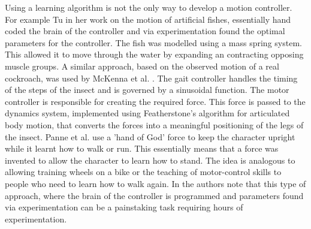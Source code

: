 Using a learning algorithm is not the only way to develop a motion controller.
For example Tu \cite{TuTerzopoulos} in her work on the motion of artificial
fishes, essentially hand coded the brain of the controller and via
experimentation found the optimal parameters for the controller. The fish was
modelled using a mass spring system. This allowed it to move through the water
by expanding an contracting opposing muscle groups.  A similar approach, based
on the observed motion of a real cockroach, was used by McKenna et al.
\cite{McKennaZeltzer}. The gait controller handles the timing of the steps of
the insect and is governed by a sinusoidal function. The motor controller is
responsible for creating the required force.  This force is passed to the
dynamics system, implemented using Featherstone's algorithm for articulated body
motion, that converts the forces into a meaningful positioning of the legs of
the insect. Panne et al. \cite{PanneLamouret} use a 'hand of God'
force to keep the character upright while it learnt how to walk or run. This
essentially means that a force was invented to allow the character to learn how
to stand. The idea is analogous to allowing training wheels on a bike or the
teaching of motor-control skills to people who need to learn how to walk again.
In \cite{GrzeszczukTerzopoulos} the authors note that this type of approach,
where the brain of the controller is programmed and parameters found via
experimentation can be a painstaking task requiring hours of experimentation.

